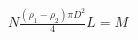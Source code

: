 \documentclass[preview]{standalone}
\begin{document}
\begin{align*}
N \tfrac{(\rho_1 - \rho_2)\pi D^2}{4} L = M
\end{align*}
\end{document}
